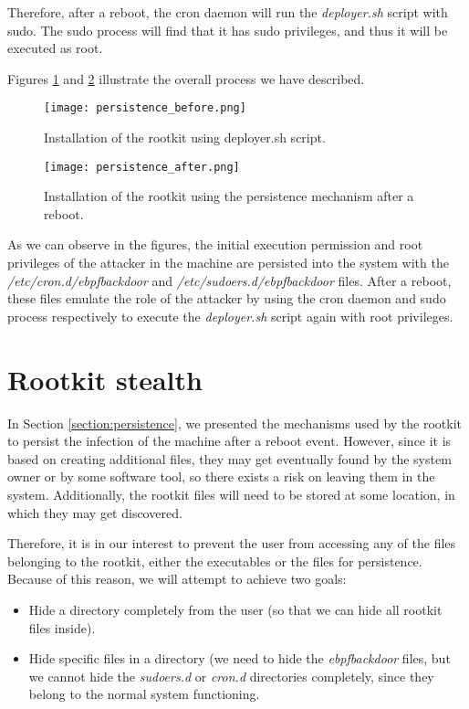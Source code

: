 Therefore, after a reboot, the cron daemon will run the \textit{deployer.sh} script with sudo. The sudo process will find that it has sudo privileges, and thus it will be executed as root.

Figures \ref{fig:persistence_before} and \ref{fig:persistence_after} illustrate the overall process we have described.

\begin{figure}[htbp]
	\centering
	\texttt{[image: persistence\_before.png]}
	\caption{Installation of the rootkit using deployer.sh script.}
	\label{fig:persistence_before}
\end{figure}

\begin{figure}[htbp]
	\centering
	\texttt{[image: persistence\_after.png]}
	\caption{Installation of the rootkit using the persistence mechanism after a reboot.}
	\label{fig:persistence_after}
\end{figure}


As we can observe in the figures, the initial execution permission and root privileges of the attacker in the machine are persisted into the system with the \textit{/etc/cron.d/ebpfbackdoor} and \textit{/etc/sudoers.d/ebpfbackdoor} files. After a reboot, these files emulate the role of the attacker by using the cron daemon and sudo process respectively to execute the \textit{deployer.sh} script again with root privileges.



\section{Rootkit stealth} \label{section:rootkti_stealth}
In Section \ref{section:persistence}, we presented the mechanisms used by the rootkit to persist the infection of the machine after a reboot event. However, since it is based on creating additional files, they may get eventually found by the system owner or by some software tool, so there exists a risk on leaving them in the system. Additionally, the rootkit files will need to be stored at some location, in which they may get discovered.

Therefore, it is in our interest to prevent the user from accessing any of the files belonging to the rootkit, either the executables or the files for persistence. Because of this reason, we will attempt to achieve two goals:
\begin{itemize}
\item Hide a directory completely from the user (so that we can hide all rootkit files inside).
\item Hide specific files in a directory (we need to hide the \textit{ebpfbackdoor} files, but we cannot hide the \textit{sudoers.d} or \textit{cron.d} directories completely, since they belong to the normal system functioning.
\end{itemize}

